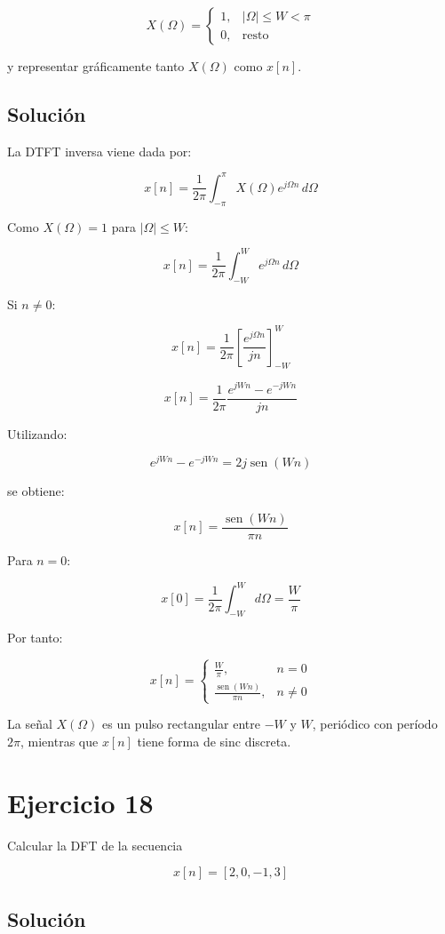 \documentclass[fleqn]{article}
\DeclareMathOperator{\sen}{sen}
\begin{document}
	\[
	X(\Omega)=
	\begin{cases}
	1, & |\Omega|\leq W<\pi \\[1mm]
	0, & \text{resto}
	\end{cases}
	\]

	y representar gráficamente tanto $X(\Omega)$ como $x[n]$.

	\subsection{Solución}

	La DTFT inversa viene dada por:

	\[
	x[n]
	=
	\frac{1}{2\pi}
	\int_{-\pi}^{\pi}
	X(\Omega)e^{j\Omega n}\,d\Omega
	\]

	Como $X(\Omega)=1$ para $|\Omega|\leq W$:

	\[
	x[n]
	=
	\frac{1}{2\pi}
	\int_{-W}^{W}
	e^{j\Omega n}\,d\Omega
	\]

	Si $n\neq0$:

	\[
	x[n]
	=
	\frac{1}{2\pi}
	\left[
	\frac{e^{j\Omega n}}{jn}
	\right]_{-W}^{W}
	\]

	\[
	x[n]
	=
	\frac{1}{2\pi}
	\frac{
	e^{jWn}-e^{-jWn}
	}{jn}
	\]

	Utilizando:

	\[
	e^{jWn}-e^{-jWn}
	=
	2j\sen(Wn)
	\]

	se obtiene:

	\[
	x[n]
	=
	\frac{\sen(Wn)}{\pi n}
	\]

	Para $n=0$:

	\[
	x[0]
	=
	\frac{1}{2\pi}
	\int_{-W}^{W}d\Omega
	=
	\frac{W}{\pi}
	\]

	Por tanto:

	\[
	\boxed{
	x[n]=
	\begin{cases}
	\displaystyle\frac{W}{\pi}, & n=0 \\[3mm]
	\displaystyle\frac{\sen(Wn)}{\pi n}, & n\neq0
	\end{cases}
	}
	\]

	La señal $X(\Omega)$ es un pulso rectangular entre $-W$ y $W$,
	periódico con período $2\pi$, mientras que $x[n]$ tiene forma de sinc discreta.

\section{Ejercicio 18}
	Calcular la DFT de la secuencia

	\[
	x[n]=[2,0,-1,3]
	\]

	\subsection{Solución}
\end{document}
